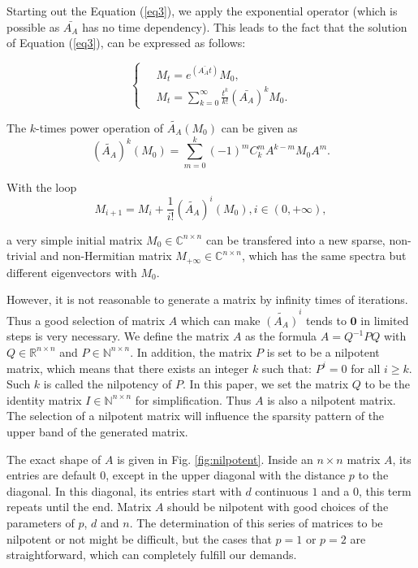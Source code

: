 Starting out the Equation (\ref{eq3}), we apply the exponential operator (which is possible as $\bar{A_A}$ has no time dependency). This leads to the fact that the solution of Equation  (\ref{eq3}), can be expressed as follows:

\begin{equation}
\label{eq4}
\left\{\
\begin{aligned} 
&M_t = e^{(\bar{A_At})}M_0, \\ 
&M_t=\sum_{k=0}^{\infty} \frac{t^k}{k!}(\bar{A_A})^kM_0.
\end{aligned}
\right.
\end{equation}

The $k$-times power operation of $\widetilde{A_A}(M_0)$ can be given as
\begin{equation}
(\widetilde{A_A})^k(M_0)=\sum_{m=0}^{k}(-1)^mC_k^mA^{k-m}M_0A^m.
\end{equation}

With the loop 
\begin{equation}
M_{i+1}=M_i+\frac{1}{i!}(\widetilde{A_A})^i(M_0), i\in(0,+\infty),
\end{equation}

a very simple initial matrix $M_0 \in \mathbb{C}^{n \times n}$ can be transfered into a new sparse, non-trivial and non-Hermitian matrix $M_{+\infty} \in \mathbb{C}^{n \times n}$, which has the same spectra but different eigenvectors with $M_0$.

However, it is not reasonable to generate a matrix by infinity times of iterations. Thus a good selection of matrix $A$ which can make $\widetilde{(A_A)}^i$ tends to $\textbf{0}$ in limited steps is very necessary. We define the matrix $A$  as the formula $A=Q^{-1}PQ$ with $Q \in \mathbb{R}^{n \times n}$ and $P \in \mathbb{N}^{n \times n}$. In addition, the matrix $P$ is set to be a nilpotent matrix, which means that there exists an integer $k$ such that: $P^i=0$ for all $i \ge k$. Such $k$ is called the nilpotency of $P$.  In this paper, we set the matrix $Q$ to be the identity matrix $I \in \mathbb{N}^{n \times n}$ for simplification. Thus $A$ is also a nilpotent matrix.  The selection of a nilpotent matrix will influence the sparsity pattern of the upper band of the generated matrix. 

The exact shape of $A$ is given in Fig. \ref{fig:nilpotent}. Inside an $n \times n$ matrix $A$, its entries are default $0$, except in the upper diagonal with the distance $p$ to the diagonal. In this diagonal, its entries start with $d$ continuous $1$ and a $0$, this term repeats until the end. Matrix $A$ should be nilpotent with good choices of the parameters of $p$, $d$ and $n$. The determination of this series of matrices to be nilpotent or not might be difficult, but the cases that $p=1$ or $p=2$ are straightforward, which can completely fulfill our demands.

